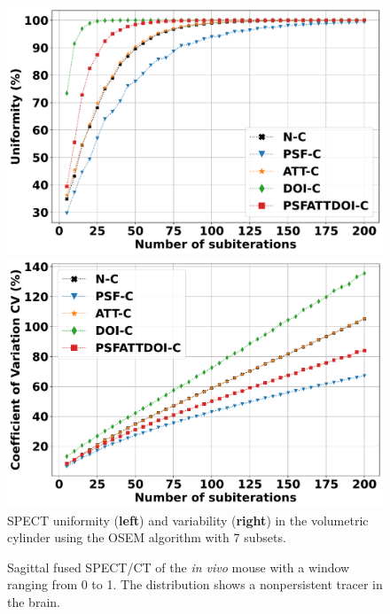 \documentclass[utf8]{FrontiersinHarvard} %
\begin{document}
\begin{figure}
    \centering
    \begin{minipage}[t]{0.5\textwidth}
        \includegraphics[width=\linewidth]{Figures/VSAC_Uniformity.pdf}
    \end{minipage}%
    \begin{minipage}[t]{0.5\textwidth}
        \includegraphics[width=\linewidth]{Figures/VSAC_CV.pdf}
    \end{minipage}
\caption{SPECT uniformity (\textbf{left}) and variability (\textbf{right}) in the volumetric cylinder using the OSEM algorithm with 7 subsets.}\label{fig:uniformity_variability}
\end{figure}


\begin{figure}[h!]
\begin{center}
\end{center}
\caption{Sagittal fused SPECT/CT of the \textit{in vivo} mouse with a window ranging from 0 to 1. The  distribution shows a nonpersistent tracer in the brain.}\label{fig:invivo}
\end{figure}
\end{document}
